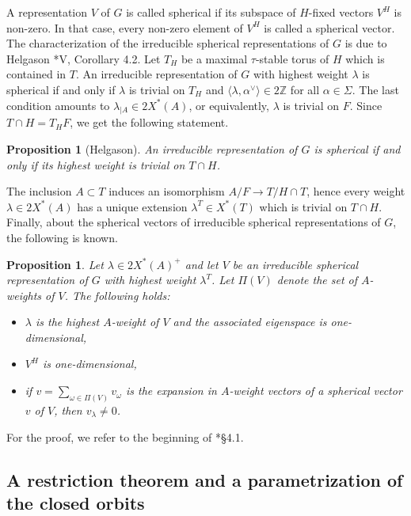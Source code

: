\documentclass{amsart}
\newtheorem{proposition}[theorem]{Proposition}
\theoremstyle{definition}
\begin{document}
A representation $V$ of $G$ is called spherical if its subspace of $H$-fixed vectors $V^H$ is non-zero. In that case, every non-zero element of $V^H$ is called a spherical vector. The characterization of the irreducible spherical representations of $G$ is due to Helgason \cite{Helgason2}*{V, Corollary 4.2}. Let $T_H$ be a maximal $\tau$-stable torus of $H$ which is contained in $T$. An irreducible representation of $G$ with highest weight $\lambda$ is spherical if and only if $\lambda$ is trivial on $T_H$ and $\langle \lambda, \alpha^\vee \rangle \in 2\mathbb{Z}$ for all $\alpha \in \Sigma$. The last condition amounts to $\lambda_{|A} \in 2X^*(A)$, or equivalently, $\lambda$ is trivial on $F$. Since $T\cap H = T_H F$, we get the following statement.

\begin{proposition}[Helgason] \label{characspherical}
    An irreducible representation of $G$ is spherical if and only if its highest weight is trivial on $T \cap H$.
\end{proposition}

The inclusion $A \subset T$ induces an isomorphism $A/F \to T/H\cap T$, hence every weight $\lambda \in 2X^*(A)$ has a unique extension $\lambda^T \in X^*(T)$ which is trivial on $T\cap H$. Finally, about the spherical vectors of irreducible spherical representations of $G$, the following is known.

\begin{proposition}\label{spherical}
    Let $\lambda \in 2X^*(A)^+$ and let $V$ be an irreducible spherical representation of $G$ with highest weight $\lambda^T$. Let $\Pi(V)$ denote the set of $A$-weights of $V$. The following holds:
    \begin{itemize}
        \item $\lambda$ is the highest $A$-weight of $V$ and the associated eigenspace is one-dimensional,
        \item $V^H$ is one-dimensional,
        \item if $v = \sum_{ \omega \in \Pi(V)}v_\omega$ is the expansion in $A$-weight vectors of a spherical vector $v$ of $V$, then $v_{\lambda} \neq 0$.
    \end{itemize}
\end{proposition}

For the proof, we refer to the beginning of \cite{KKS}*{§4.1}.

\subsection{A restriction theorem and a parametrization of the closed orbits}
\end{document}
